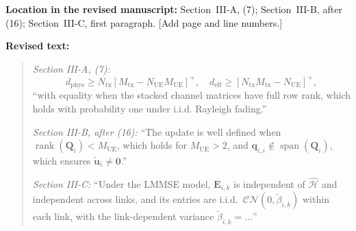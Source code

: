 \documentclass[a4paper,12pt]{article}
\newcommand{\revisionlocation}[1]{\par\textbf{Location in the revised manuscript:} #1\par}
\newenvironment{revisedtext}{%
  \par\textbf{Revised text:}\begin{quote}\color{red}
}{\end{quote}}
\begin{document}
\revisionlocation{Section~III-A, (7); Section~III-B, after (16);
Section~III-C, first paragraph. [Add page and line numbers.]}
\begin{revisedtext}
\textit{Section III-A, (7):}
\begin{equation*}
d_{\mathrm{phys}}\ge N_{\mathrm{tx}}[M_{\mathrm{tx}}-N_{\mathrm{UE}}M_{\mathrm{UE}}]^+,\quad
d_{\mathrm{eff}}\ge[N_{\mathrm{tx}}M_{\mathrm{tx}}-N_{\mathrm{UE}}]^+,
\end{equation*}
``with equality when the stacked channel matrices have full row rank,
which holds with probability one under i.i.d. Rayleigh fading.''

\textit{Section III-B, after (16):} ``The update is well defined when
$\operatorname{rank}(\mathbf{Q}_i)<M_{\mathrm{UE}}$, which holds for
$M_{\mathrm{UE}}>2$, and $\mathbf{q}_{i,i}\notin\operatorname{span}(\mathbf{Q}_i)$,
which ensures $\widetilde{\mathbf{u}}_i\neq\mathbf{0}$.''

\textit{Section III-C:} ``Under the LMMSE model, $\mathbf{E}_{i,k}$ is
independent of $\widehat{\mathcal{H}}$ and independent across links, and its
entries are i.i.d.\ $\mathcal{CN}(0,\widetilde{\beta}_{i,k})$ within each
link, with the link-dependent variance $\widetilde\beta_{i,k}=\ldots$''
\end{revisedtext}
\end{document}
